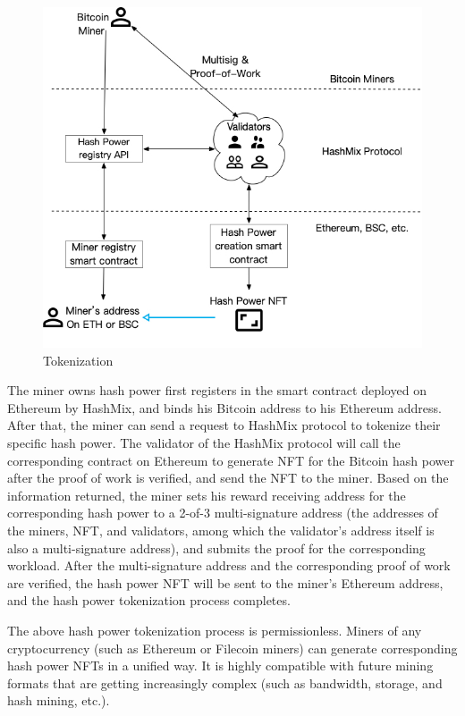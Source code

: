 \documentclass[]{template/llncs}
\begin{document}
\begin{figure}[htbp]
\centering
\includegraphics[width=0.9\columnwidth]{figure/Tokenize-new-en}
\caption{Tokenization}
\label{fig:tokenization}
\end{figure}

The miner owns hash power first registers in the smart contract deployed on Ethereum by HashMix, and binds his Bitcoin address to his Ethereum address. After that, the miner can send a request to HashMix protocol to tokenize their specific hash power. The validator of the HashMix protocol will call the corresponding contract on Ethereum to generate NFT for the Bitcoin hash power after the proof of work is verified, and send the NFT to the miner. Based on the information returned, the miner sets his reward receiving address for the corresponding hash power to a 2-of-3 multi-signature address (the addresses of the miners, NFT, and validators, among which the validator’s address itself is also a multi-signature address), and submits the proof for the corresponding workload. After the multi-signature address and the corresponding proof of work are verified, the hash power NFT will be sent to the miner's Ethereum address, and the hash power tokenization process completes.

The above hash power tokenization process is permissionless. Miners of any cryptocurrency (such as Ethereum or Filecoin miners) can generate corresponding hash power NFTs in a unified way. It is highly compatible with future mining formats that are getting increasingly complex (such as bandwidth, storage, and hash mining, etc.).
\end{document}
